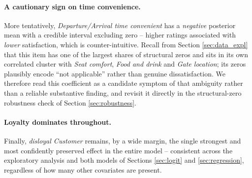 \paragraph{A cautionary sign on time convenience.}
More tentatively, \textit{Departure/Arrival time convenient} has a
\emph{negative} posterior mean with a credible interval excluding zero -- higher
ratings associated with \emph{lower} satisfaction, which is counter-intuitive.
Recall from Section \ref{sec:data_expl} that this item has one of the largest
shares of structural zeros and sits in its own correlated cluster with
\textit{Seat comfort}, \textit{Food and drink} and \textit{Gate location}; its
zeros plausibly encode ``not applicable'' rather than genuine dissatisfaction.
We therefore read this coefficient as a candidate symptom of that ambiguity
rather than a reliable substantive finding, and revisit it directly in the
structural-zero robustness check of Section \ref{sec:robustness}.

\paragraph{Loyalty dominates throughout.}
Finally, \textit{disloyal Customer} remains, by a wide margin, the single
strongest and most confidently preserved effect in the entire model -- consistent
across the exploratory analysis and both models of Sections \ref{sec:logit} and
\ref{sec:regression}, regardless of how many other covariates are present.

